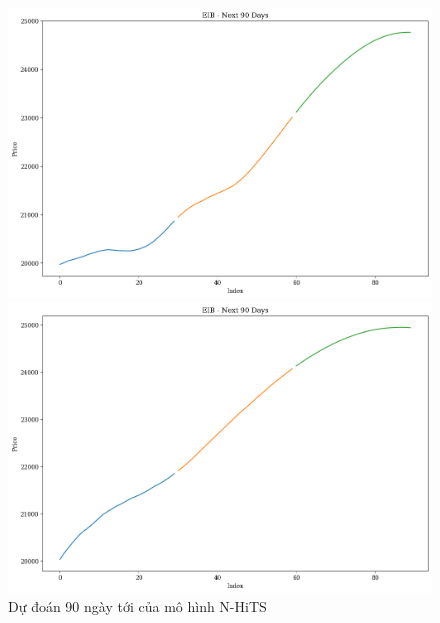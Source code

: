 \begin{figure}[H]
\begin{minipage}{0.15\textwidth}
    \includegraphics[width=1\textwidth]{resources/chapter-5/newdata1/predicted/EIB_N-HiTS_8-2_90Days.png}
    \end{minipage}
    \hfill
        \begin{minipage}{0.15\textwidth}
    \centering
    \includegraphics[width=1\textwidth]{resources/chapter-5/newdata1/predicted/EIB_N-HiTS_9-1_90Days.png}
    \end{minipage}
    \hfill
    
    \caption{Dự đoán 90 ngày tới của mô hình N-HiTS}
    \label{fig:n-hits_predicted}
\end{figure}